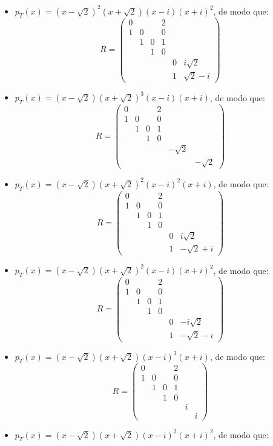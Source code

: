 \documentclass[11pt,a4paper]{article}
\begin{document}
{\begin{itemize}
\[\begin{pmatrix}
\end{pmatrix}
\]
\item $p_T(x)=(x-\sqrt{2})^2(x+\sqrt{2})(x-i)(x+i)^2$, de modo que:
\[
R=\begin{pmatrix}
0&&&2&&\\1&0&&0&&\\&1&0&1&&\\&&1&0&&\\&&&&0&i\sqrt{2}\\&&&&1&\sqrt{2}-i
\end{pmatrix}
\]
\item $p_T(x)=(x-\sqrt{2})(x+\sqrt{2})^3(x-i)(x+i)$, de modo que:
\[
R=\begin{pmatrix}
0&&&2&&\\1&0&&0&&\\&1&0&1&&\\&&1&0&&\\&&&&-\sqrt{2}&\\&&&&&-\sqrt{2}
\end{pmatrix}
\]
\item $p_T(x)=(x-\sqrt{2})(x+\sqrt{2})^2(x-i)^2(x+i)$, de modo que:
\[
R=\begin{pmatrix}
0&&&2&&\\1&0&&0&&\\&1&0&1&&\\&&1&0&&\\&&&&0&i\sqrt{2}\\&&&&1&-\sqrt{2}+i
\end{pmatrix}
\]
\item $p_T(x)=(x-\sqrt{2})(x+\sqrt{2})^2(x-i)(x+i)^2$, de modo que:
\[
R=\begin{pmatrix}
0&&&2&&\\1&0&&0&&\\&1&0&1&&\\&&1&0&&\\&&&&0&-i\sqrt{2}\\&&&&1&-\sqrt{2}-i
\end{pmatrix}
\]
\item $p_T(x)=(x-\sqrt{2})(x+\sqrt{2})(x-i)^3(x+i)$, de modo que:
\[
R=\begin{pmatrix}
0&&&2&&\\1&0&&0&&\\&1&0&1&&\\&&1&0&&\\&&&&i&\\&&&&&i
\end{pmatrix}
\]
\item $p_T(x)=(x-\sqrt{2})(x+\sqrt{2})(x-i)^2(x+i)^2$, de modo que:

\end{itemize}}
\end{document}
